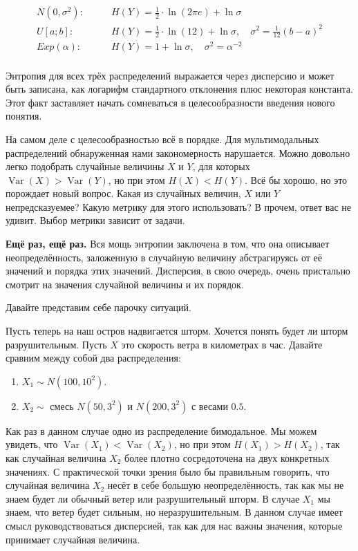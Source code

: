 \documentclass[12pt, a4paper, oneside]{extreport}
\DeclareMathOperator{\Var}{Var}
\theoremstyle{plain}              %
\theoremstyle{definition}         %
\begin{document}
\begin{equation*}
\begin{aligned}
 N(0,\sigma^2):  \qquad  &H(Y)  = \frac{1}{2} \cdot \ln(2 \pi e) + \ln \sigma \\
 U[a;b]:         \qquad     &H(Y) = \frac{1}{2} \cdot \ln(12) + \ln \sigma,  \quad  \sigma^2 = \frac{1}{12}(b-a)^2 \\ 
 Exp(\alpha):      \qquad &H(Y) = 1 + \ln \sigma, \quad \sigma^2 = \alpha^{-2}\\
\end{aligned}
\end{equation*}

 Энтропия для всех трёх распределений выражается через дисперсию и может быть записана, как логарифм стандартного отклонения плюс некоторая константа. Этот факт заставляет начать сомневаться в целесообразности введения нового понятия.

На самом деле с целесообразностью всё в порядке. Для мультимодальных распределений обнаруженная нами закономерность нарушается. Можно довольно легко подобрать случайные величины $X$ и $Y$, для которых $\Var(X) > \Var(Y)$, но при этом $H(X) < H(Y)$. Всё бы хорошо, но это порождает новый вопрос. Какая из случайных величин, $X$ или $Y$ непредсказуемее? Какую метрику для этого использовать? В прочем, ответ вас не удивит. Выбор метрики зависит от задачи. 

\textbf{Ещё раз, ещё раз.}  Вся мощь энтропии заключена в том, что она описывает неопределённость, заложенную в случайную величину абстрагируясь от её значений и порядка этих значений.  Дисперсия, в свою очередь, очень пристально смотрит на значения случайной величины и их порядок. 

Давайте представим себе парочку ситуаций. 


Пусть теперь на наш остров надвигается шторм. Хочется понять будет ли шторм разрушительным. Пусть $X$ это скорость ветра в километрах в час.   Давайте сравним между собой два распределения: 

\begin{enumerate}
\item $X_1 \sim N(100, 10^2)$. 

\item $X_2 \sim $  смесь $N(50, 3^2)$ и $N(200, 3^2)$ с весами $0.5$. 
\end{enumerate}

Как раз в данном случае одно из распределение бимодальное. Мы можем увидеть, что $\Var(X_1) <  \Var(X_2)$, но при этом $H(X_1) >  H(X_2)$, так как случайная величина $X_2$ более плотно сосредоточена на двух конкретных значениях.  С практической точки зрения было бы правильным говорить, что случайная величина $X_2$ несёт в себе большую неопределённость, так как  мы не знаем будет ли обычный ветер или разрушительный шторм. В случае $X_1$ мы знаем, что ветер будет сильным, но неразрушительным. В данном случае имеет смысл руководствоваться дисперсией, так как для нас важны значения, которые принимает случайная величина. 
\end{document}
